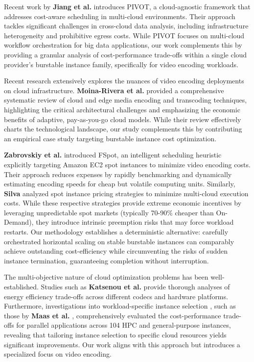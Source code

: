 \documentclass[conference]{IEEEtran}
\begin{document}
	Recent work by \textbf{Jiang et al.} \cite{b20} introduces PIVOT, a cloud-agnostic framework that addresses cost-aware scheduling in multi-cloud environments. Their approach tackles significant challenges in cross-cloud data analysis, including infrastructure heterogeneity and prohibitive egress costs. While PIVOT focuses on multi-cloud workflow orchestration for big data applications, our work complements this by providing a granular analysis of cost-performance trade-offs within a single cloud provider's burstable instance family, specifically for video encoding workloads.
	
	Recent research extensively explores the nuances of video encoding deployments on cloud infrastructure. \textbf{Moina-Rivera et al.} \cite{b22} provided a comprehensive systematic review of cloud and edge media encoding and transcoding techniques, highlighting the critical architectural challenges and emphasizing the economic benefits of adaptive, pay-as-you-go cloud models. While their review effectively charts the technological landscape, our study complements this by contributing an empirical case study targeting burstable instance cost optimization.
	
	\textbf{Zabrovskiy et al.} \cite{b21} introduced FSpot, an intelligent scheduling heuristic explicitly targeting Amazon EC2 spot instances to minimize video encoding costs. Their approach reduces expenses by rapidly benchmarking and dynamically estimating encoding speeds for cheap but volatile computing units. Similarly, \textbf{Silva} \cite{b19} analyzed spot instance pricing strategies to minimize multi-cloud execution costs. While these respective strategies provide extreme economic incentives by leveraging unpredictable spot markets (typically 70-90\% cheaper than On-Demand), they introduce intrinsic preemption risks that may force workload restarts. Our methodology establishes a deterministic alternative: carefully orchestrated horizontal scaling on stable burstable instances can comparably achieve outstanding cost-efficiency while circumventing the risks of sudden instance termination, guaranteeing completion without interruption.
	
	The multi-objective nature of cloud optimization problems has been well-established. Studies such as \textbf{Katsenou et al.} \cite{b8} provide thorough analyses of energy efficiency trade-offs across different codecs and hardware platforms. Furthermore, investigations into workload-specific instance selection \cite{b14}, such as those by \textbf{Maas et al.} \cite{b1}, comprehensively evaluated the cost-performance trade-offs for parallel applications across 104 HPC and general-purpose instances, revealing that tailoring instance selection to specific cloud resources yields significant improvements. Our work aligns with this approach but introduces a specialized focus on video encoding.
\end{document}
